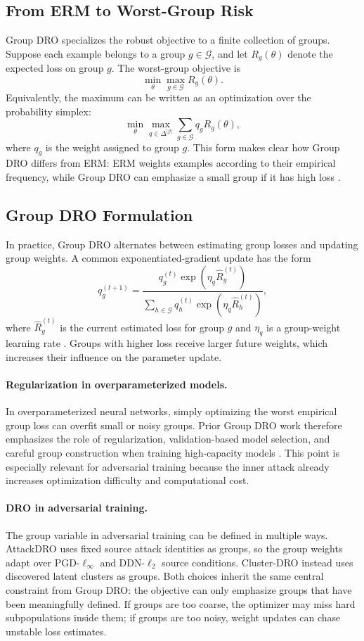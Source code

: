 \subsection{From ERM to Worst-Group Risk}

Group DRO specializes the robust objective to a finite collection of groups. Suppose each example belongs to a group $g\in\mathcal{G}$, and let $R_g(\theta)$ denote the expected loss on group $g$. The worst-group objective is
\[
\min_{\theta}
\max_{g\in\mathcal{G}}
R_g(\theta).
\]
Equivalently, the maximum can be written as an optimization over the probability simplex:
\[
\min_{\theta}
\max_{q\in\Delta^{|\mathcal{G}|}}
\sum_{g\in\mathcal{G}} q_g R_g(\theta),
\]
where $q_g$ is the weight assigned to group $g$. This form makes clear how Group DRO differs from ERM: ERM weights examples according to their empirical frequency, while Group DRO can emphasize a small group if it has high loss \cite{sagawa2019groupdro}.

\subsection{Group DRO Formulation}

In practice, Group DRO alternates between estimating group losses and updating group weights. A common exponentiated-gradient update has the form
\[
q_g^{(t+1)}
=
\frac{
q_g^{(t)}\exp(\eta_q \hat{R}_g^{(t)})
}{
\sum_{h\in\mathcal{G}}
q_h^{(t)}\exp(\eta_q \hat{R}_h^{(t)})
},
\]
where $\hat{R}_g^{(t)}$ is the current estimated loss for group $g$ and $\eta_q$ is a group-weight learning rate \cite{kivinen1997exponentiated,sagawa2019groupdro}. Groups with higher loss receive larger future weights, which increases their influence on the parameter update.

\paragraph{Regularization in overparameterized models.}
In overparameterized neural networks, simply optimizing the worst empirical group loss can overfit small or noisy groups. Prior Group DRO work therefore emphasizes the role of regularization, validation-based model selection, and careful group construction when training high-capacity models \cite{sagawa2019groupdro}. This point is especially relevant for adversarial training because the inner attack already increases optimization difficulty and computational cost.

\paragraph{DRO in adversarial training.}
The group variable in adversarial training can be defined in multiple ways. AttackDRO uses fixed source attack identities as groups, so the group weights adapt over PGD-$\ell_\infty$ and DDN-$\ell_2$ source conditions. Cluster-DRO instead uses discovered latent clusters as groups. Both choices inherit the same central constraint from Group DRO: the objective can only emphasize groups that have been meaningfully defined. If groups are too coarse, the optimizer may miss hard subpopulations inside them; if groups are too noisy, weight updates can chase unstable loss estimates.

